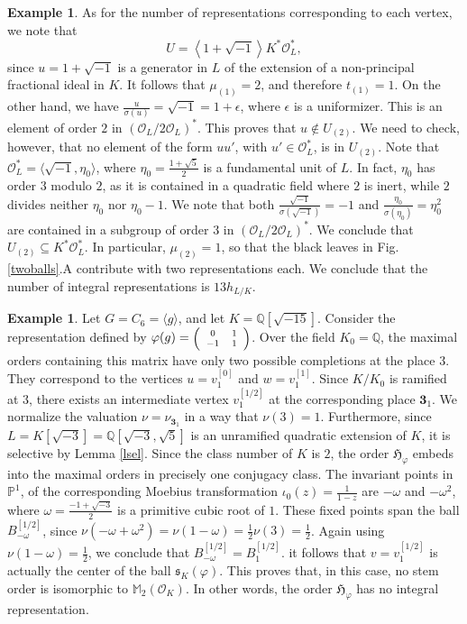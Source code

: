 \documentclass{article}
\theoremstyle{definition}
\newtheorem{ex}[Prop]{Example}
\theoremstyle{remark}
\newcommand\sbmattrix[4]{\textnormal{\scriptsize$\left(\begin{array}{cc}#1&#2\\#3&#4\end{array}\right)$\normalsize}}
\begin{document}
\begin{ex}
    As for the number of representations corresponding to
    each vertex, we note that
    $$U=\left\langle1+\sqrt{-1}\right\rangle 
    K^*\mathcal{O}^*_L,$$
    since $u=1+\sqrt{-1}$ is a generator 
    in $L$ of the extension
    of a non-principal fractional ideal in $K$. It follows that
    $\mu_{(1)}=2$, and therefore $t_{(1)}=1$. 
    On the other hand,
    we have $\frac u{\sigma(u)}=\sqrt{-1}=1+\epsilon$, where
    $\epsilon$ is a uniformizer. This is an element of order
    $2$ in $(\mathcal{O}_L/2\mathcal{O}_L)^*$. This proves that
    $u\notin U_{(2)}$. We need to check, however, that no 
    element of the form $uu'$, with $u'\in\mathcal{O}_L^*$, 
    is in $U_{(2)}$. Note that $\mathcal{O}_L^*
    =\langle\sqrt{-1},\eta_0\rangle$,
    where $\eta_0=\frac{1+\sqrt{5}}2$ is a fundamental unit 
    of $L$. In fact, $\eta_0$ has order $3$ modulo $2$, 
    as it is contained
    in a quadratic field where $2$ is inert, while $2$ 
    divides neither $\eta_0$ nor $\eta_0-1$. We note that 
    both $\frac {\sqrt{-1}}{\sigma(\sqrt{-1})}=-1$ and
    $\frac {\eta_0}{\sigma(\eta_0)}=\eta_0^2$ are
    contained in a subgroup of order $3$ in 
    $(\mathcal{O}_L/2\mathcal{O}_L)^*$. We conclude
    that $U_{(2)}\subseteq K^*\mathcal{O}_L^*$. In particular, 
    $\mu_{(2)}=1$, so  that the black leaves in Fig. 
    \ref{twoballs}.A contribute
    with two representations each. We conclude that the number
    of integral representations is $13h_{L/K}$.
\end{ex}

\begin{ex}\label{e89b}
    Let $G=C_6=\langle g\rangle$, and let 
    $K=\mathbb{Q}[\sqrt{-15}]$. Consider
    the representation defined by 
    $\varphi(g)=\sbmattrix 01{-1}1$. Over the field 
    $K_0=\mathbb{Q}$, the maximal orders containing this
    matrix have only two possible completions at the place $3$.
    They correspond to the vertices $u=v_1^{[0]}$ 
    and $w=v_1^{[1]}$.
    Since $K/K_0$ is ramified at $3$, there 
    exists an intermediate
    vertex $v_1^{[1/2]}$ at the corresponding
    place $\mathbf{3}_1$. We normalize the valuation
    $\nu=\nu_{\mathbf{3}_1}$ in a way that $\nu(3)=1$.
    Furthermore, since $L=K[\sqrt{-3}]=
    \mathbb{Q}[\sqrt{-3},\sqrt5]$ is an unramified quadratic
    extension of $K$, it is selective by Lemma \ref{lsel}. 
    Since the class number
    of $K$ is $2$, the order $\mathfrak{H}_\varphi$ embeds into
    the maximal orders in precisely one conjugacy class.
    The invariant points in $\mathbb{P}^1$, 
    of the corresponding
    Moebius transformation $\iota_0(z)=\frac1{1-z}$ are
    $-\omega$ and $-\omega^2$, where 
    $\omega=\frac{-1+\sqrt{-3}}2$ is a primitive cubic root of
    $1$. These fixed points span the ball
    $B_{-\omega}^{[1/2]}$, since 
    $\nu(-\omega+\omega^2)=
    \nu(1-\omega)=\frac12\nu(3)=\frac12$.
    Again using $\nu(1-\omega)=\frac12$, we conclude that
    $B_{-\omega}^{[1/2]}=B_1^{[1/2]}$. it follows that 
    $v=v_1^{[1/2]}$ is actually the center of the ball
    $\mathfrak{s}_K(\varphi)$. This proves that, in this case,
    no stem order is isomorphic to 
    $\mathbb{M}_2(\mathcal{O}_K)$.
    In other words, the order 
    $\mathfrak{H}_\varphi$ has no integral representation.
\end{ex}
\end{document}
